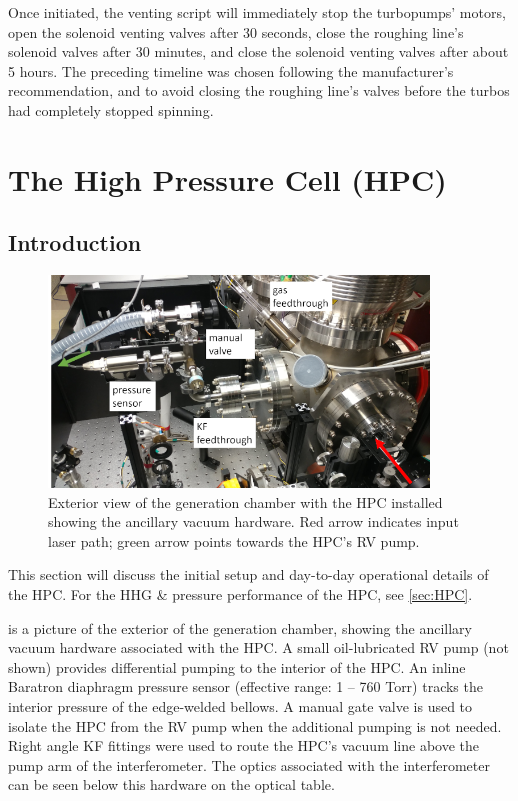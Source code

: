 Once initiated, the venting script will immediately stop the turbopumps' motors, open the solenoid venting valves after 30 seconds, close the roughing line's solenoid valves after 30 minutes, and close the solenoid venting valves after about 5 hours. The preceding timeline was chosen following the manufacturer's recommendation, and to avoid closing the roughing line's valves before the turbos had completely stopped spinning. 

\section{The High Pressure Cell (HPC)}
\label{app:HPC_instructions}

\subsection{Introduction}

\begin{figure}
	\centering
	\includegraphics[width=0.9\textwidth]{figures/app1/HPC_outside_view_lowres.png}
	\caption{Exterior view of the generation chamber with the HPC installed showing the ancillary vacuum hardware. Red arrow indicates input laser path; green arrow points towards the HPC's RV pump.}
	\label{fig:HPC_outside_view}
\end{figure}

This section will discuss the initial setup and day-to-day operational details of the HPC. For the HHG \& pressure performance of the HPC, see \cref{sec:HPC}.

 is a picture of the exterior of the generation chamber, showing the ancillary vacuum hardware associated with the HPC. A small oil-lubricated RV pump (not shown) provides differential pumping to the interior of the HPC. An inline Baratron diaphragm pressure sensor (effective range: 1 -- 760 Torr) tracks the interior pressure of the edge-welded bellows. A manual gate valve is used to isolate the HPC from the RV pump when the additional pumping is not needed. Right angle KF fittings were used to route the HPC's vacuum line above the pump arm of the interferometer. The optics associated with the interferometer can be seen below this hardware on the optical table.

